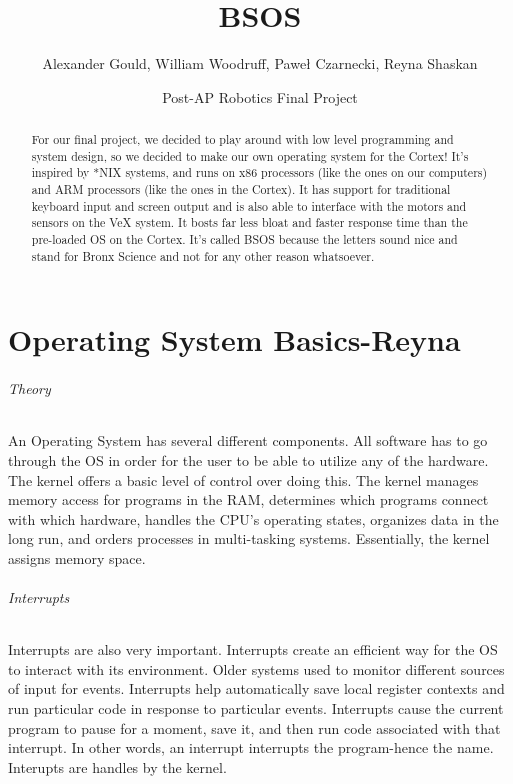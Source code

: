 \documentclass[english]{article}
\begin{document}
\title{BSOS}


\author{Alexander Gould, William Woodruff, Pawe\l{} Czarnecki, Reyna Shaskan}


\date{Post-AP Robotics Final Project}
\maketitle
\begin{abstract}
For our final project, we decided to play around with low level programming
and system design, so we decided to make our own operating system
for the Cortex! It's inspired by {*}NIX systems, and runs on x86 processors
(like the ones on our computers) and ARM processors (like the ones
in the Cortex). It has support for traditional keyboard input and
screen output and is also able to interface with the motors and sensors
on the VeX system. It bosts far less bloat and faster response time
than the pre-loaded OS on the Cortex. It's called BSOS because the
letters sound nice and stand for Bronx Science and not for any other reason whatsoever.
\end{abstract}

\part{Operating System Basics-Reyna}
\paragraph{Theory}
An Operating System has several different components. All software has to go through the OS in order for the user to be able to utilize any of the hardware. The kernel offers a basic level of control over doing this. The kernel manages memory access for programs in the RAM, determines which programs connect with which hardware, handles the CPU's operating states, organizes data in the long run, and orders processes in multi-tasking systems. Essentially, the kernel assigns memory space.

\paragraph{Interrupts}
Interrupts are also very important. Interrupts create an efficient way for the OS to interact with its environment. Older systems used to monitor different sources of input for events. Interrupts help automatically save local register contexts and run particular code in response to particular events. Interrupts cause the current program to pause for a moment, save it, and then run code associated with that interrupt. In other words, an interrupt interrupts the program-hence the name. Interupts are handles by the kernel.
\end{document}
